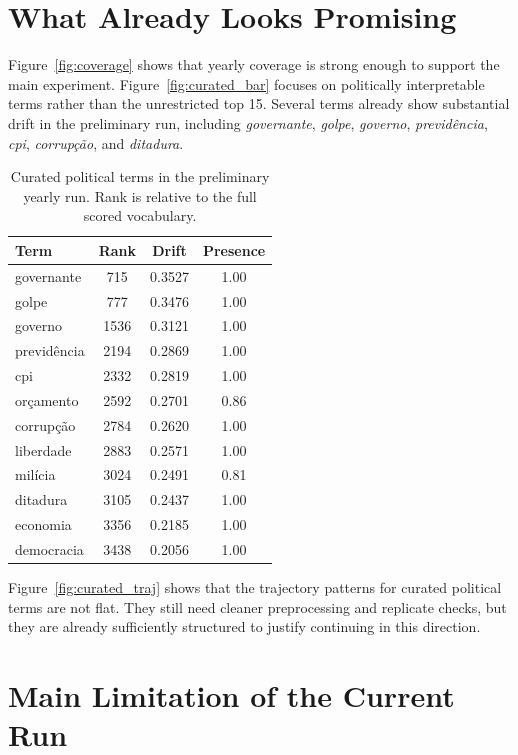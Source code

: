 \documentclass[12pt]{article}
\begin{document}
\section{What Already Looks Promising}

Figure~\ref{fig:coverage} shows that yearly coverage is strong enough to support the main
experiment. Figure~\ref{fig:curated_bar} focuses on politically interpretable terms rather
than the unrestricted top 15. Several terms already show substantial drift in the preliminary
run, including \textit{governante}, \textit{golpe}, \textit{governo}, \textit{previd\^encia},
\textit{cpi}, \textit{corrup\c{c}\~ao}, and \textit{ditadura}.

\begin{table}[H]
    \centering
    \caption{Curated political terms in the preliminary yearly run. Rank is relative to the full scored vocabulary.}
    \label{tab:curated_terms}
    \begin{tabular}{lccc}
        \toprule
        Term & Rank & Drift & Presence \\
        \midrule
        governante & 715 & 0.3527 & 1.00 \\
        golpe & 777 & 0.3476 & 1.00 \\
        governo & 1536 & 0.3121 & 1.00 \\
        previd\^encia & 2194 & 0.2869 & 1.00 \\
        cpi & 2332 & 0.2819 & 1.00 \\
        or\c{c}amento & 2592 & 0.2701 & 0.86 \\
        corrup\c{c}\~ao & 2784 & 0.2620 & 1.00 \\
        liberdade & 2883 & 0.2571 & 1.00 \\
        mil\'icia & 3024 & 0.2491 & 0.81 \\
        ditadura & 3105 & 0.2437 & 1.00 \\
        economia & 3356 & 0.2185 & 1.00 \\
        democracia & 3438 & 0.2056 & 1.00 \\
        \bottomrule
    \end{tabular}
\end{table}

Figure~\ref{fig:curated_traj} shows that the trajectory patterns for curated political terms
are not flat. They still need cleaner preprocessing and replicate checks, but they are already
sufficiently structured to justify continuing in this direction.

\section{Main Limitation of the Current Run}
\end{document}
